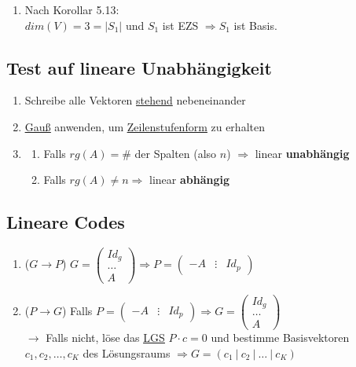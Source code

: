 \documentclass{scrartcl}
\newcommand{\linkTo}[1]{\hyperref[#1]{\underline{#1}}}
\newcommand{\linkToRef}[2][ref]{\hyperref[#1]{\underline{#2}}}
\begin{document}
\begin{Beispiel}
\begin{itemize}
\begin{enumerate}[label={(\arabic*)}]
			\item %
			Nach Korollar 5.13:\\
			$dim(V) = 3 = |S_1| $ und $S_1$ ist EZS $\Rightarrow S_1$ ist Basis.
        \end{enumerate}
		
\end{itemize}

\end{Beispiel}

\subsection{Test auf lineare Unabhängigkeit}

\begin{enumerate}
\item Schreibe alle Vektoren \underline{stehend} nebeneinander
\item \linkToRef[Gauss]{Gauß} anwenden, um \linkTo{Zeilenstufenform} zu erhalten
\item 
    \begin{enumerate}
    \item Falls $rg(A) = \# $ der Spalten (also $n$) $\Rightarrow$ linear \textbf{unabhängig}
    \item Falls $rg(A) \neq n  \Rightarrow $ linear \textbf{abhängig} 
    \end{enumerate}
\end{enumerate}

\subsection{Lineare Codes}

\begin{enumerate}
\item ($G \rightarrow P$) $G = \begin{pmatrix} Id_g \\ \dots \\ A \end{pmatrix} \Rightarrow P = \begin{pmatrix} -A & \vdots & Id_p \end{pmatrix} $ 
\item ($P \rightarrow G$) Falls  $ P = \begin{pmatrix} -A & \vdots & Id_p \end{pmatrix} \Rightarrow G = \begin{pmatrix} Id_g \\ \dots \\ A \end{pmatrix}$ \\
$\rightarrow$ Falls nicht, löse das \linkTo{LGS} $P \cdot c = 0 $ und bestimme Basisvektoren $c_1, c_2, \dots, c_K$ des Lösungsraums $\Rightarrow G = (c_1~|~ c_2 ~|~ \dots ~|~ c_K)$
\end{enumerate}
\end{document}
